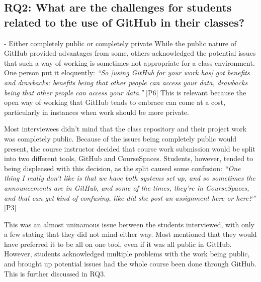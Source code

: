 \subsection{RQ2: What are the challenges for students related to the use of GitHub in their classes?}
- Either completely public or completely private
While the public nature of GitHub provided advantages from some, others acknowledged the potential issues that such a way of working is sometimes not appropriate for a class environment. One person put it eloquently: \textit{``So [using GitHub for your work has] got benefits and drawbacks: benefits being that other people can access your data, drawbacks being that other people can access your data.''} [P6] This is relevant because the open way of working that GitHub tends to embrace can come at a cost, particularly in instances when work should be more private.

Most interviewees didn't mind that the class repository and their project work was completely public. Because of the issues being completely public would present, the course instructor decided that course work submission would be split into two different tools, GitHub and CourseSpaces. Students, however, tended to being displeased with this decision, as the split caused some confusion: \textit{``One thing I really don't like is that we have both systems set up, and so sometimes the announcements are in GitHub, and some of the times, they're in CourseSpaces, and that can get kind of confusing, like did she post an assignment here or here?''} [P3]

This was an almost uninamous issue between the students interviewed, with only a few stating that they did not mind either way. Most mentioned that they would have preferred it to be all on one tool, even if it was all public in GitHub. However, students acknowledged multiple problems with the work being public, and brought up potential issues had the whole course been done through GitHub. This is further discussed in RQ3.

